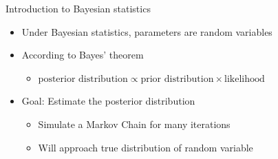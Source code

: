 \documentclass{beamer}
\begin{document}
\begin{frame}{Introduction to Bayesian statistics}
	\begin{itemize}
		\item Under Bayesian statistics, parameters are random variables
		\item According to Bayes' theorem
		\begin{itemize}
			\item $\text{posterior distribution} \propto \text{prior
			distribution}\times \text{likelihood}$
		\end{itemize}
		\item Goal: Estimate the posterior distribution
		\begin{itemize}
			\item Simulate a Markov Chain for many iterations
			\item Will approach true distribution of random variable
		\end{itemize}
	\end{itemize}
\end{frame}
\end{document}
